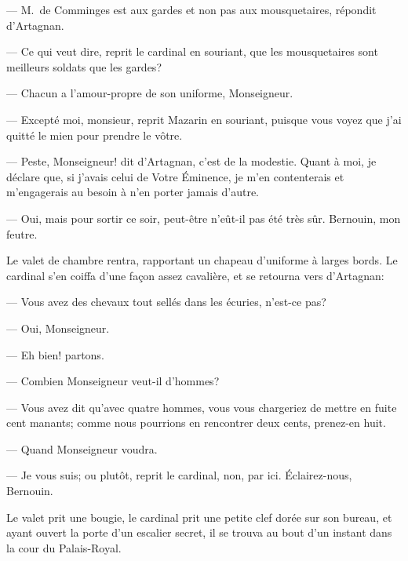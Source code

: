 — M.~de Comminges est aux gardes et non pas aux mousquetaires, répondit d'Artagnan.

— Ce qui veut dire, reprit le cardinal en souriant, que les mousquetaires sont meilleurs soldats que les gardes?

— Chacun a l'amour-propre de son uniforme, Monseigneur.

— Excepté moi, monsieur, reprit Mazarin en souriant, puisque vous voyez que j'ai quitté le mien pour prendre le vôtre.

— Peste, Monseigneur! dit d'Artagnan, c'est de la modestie. Quant à moi, je déclare que, si j'avais celui de Votre Éminence, je m'en contenterais et m'engagerais au besoin à n'en porter jamais d'autre.

— Oui, mais pour sortir ce soir, peut-être n'eût-il pas été très sûr. Bernouin, mon feutre.

Le valet de chambre rentra, rapportant un chapeau d'uniforme à larges bords. Le cardinal s'en coiffa d'une façon assez cavalière, et se retourna vers d'Artagnan:

— Vous avez des chevaux tout sellés dans les écuries, n'est-ce pas?

— Oui, Monseigneur.

— Eh bien! partons.

— Combien Monseigneur veut-il d'hommes?

— Vous avez dit qu'avec quatre hommes, vous vous chargeriez de mettre en fuite cent manants; comme nous pourrions en rencontrer deux cents, prenez-en huit.

— Quand Monseigneur voudra.

— Je vous suis; ou plutôt, reprit le cardinal, non, par ici. Éclairez-nous, Bernouin.

Le valet prit une bougie, le cardinal prit une petite clef dorée sur son bureau, et ayant ouvert la porte d'un escalier secret, il se trouva au bout d'un instant dans la cour du Palais-Royal.